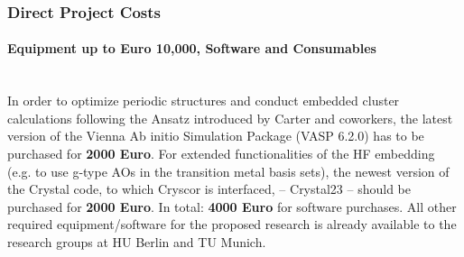 \documentclass[a4paper,11pt,headings=normal]{scrartcl}
\begin{document}
\begin{itemize}
\subsubsection{Direct Project Costs}
\paragraph{Equipment up to Euro 10,000, Software and Consumables}\ \\
\noindent
In order to optimize periodic structures and conduct embedded cluster calculations following the Ansatz 
introduced by Carter and coworkers, the latest version of the Vienna Ab initio 
Simulation Package (VASP 6.2.0) has to be purchased for \textbf{2000 Euro}. 
For extended functionalities of the HF embedding (e.g. to use g-type AOs in the 
transition metal basis sets), the newest version of the Crystal code, to which 
Cryscor is interfaced, -- Crystal23 -- should be purchased for \textbf{2000 
Euro}. In total: \textbf{4000 Euro} for software purchases.
All other required equipment/software for the proposed research is already 
available to the research groups at HU Berlin and TU Munich.  



\end{itemize}
\end{document}
